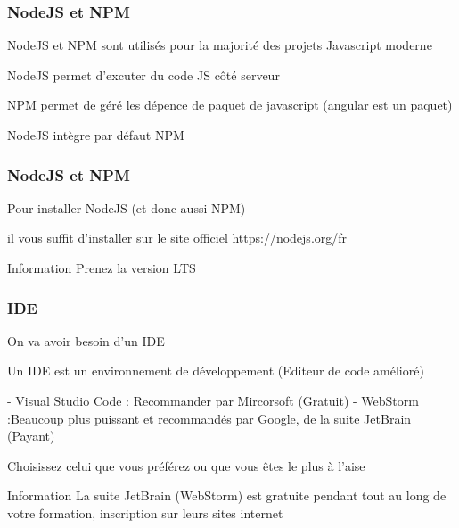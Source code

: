 \documentclass[10pt]{beamer}
\begin{document}
	\begin{frame}
		\frametitle{NodeJS et NPM}

		NodeJS et NPM sont utilisés pour la majorité des projets Javascript moderne \newline \newline

		NodeJS permet d’excuter du code JS côté serveur \newline \newline

		NPM permet de géré les dépence de paquet de javascript (angular est un paquet) \newline \newline

		NodeJS intègre par défaut NPM

	\end{frame}

	\begin{frame}
		\frametitle{NodeJS et NPM}

		Pour installer NodeJS (et donc aussi NPM) \newline \newline

		il vous suffit d'installer sur le site officiel https://nodejs.org/fr \newline \newline

		\begin{block}{Information}
			Prenez la version LTS
		\end{block}

	\end{frame}

	\begin{frame}
		\frametitle{IDE}

		On va avoir besoin d'un IDE \newline \newline

		Un IDE est un environnement de développement (Editeur de code amélioré) \newline \newline

		- Visual Studio Code : Recommander par Mircorsoft (Gratuit) \newline
		- WebStorm :Beaucoup plus puissant et recommandés par Google, de la suite JetBrain (Payant) \newline  \newline

		Choisissez celui que vous préférez ou que vous êtes le plus à l'aise  \newline \newline

		\begin{block}{Information}
			La suite JetBrain (WebStorm) est gratuite pendant tout au long de votre formation, inscription sur leurs sites internet
		\end{block}

	\end{frame}
\end{document}
